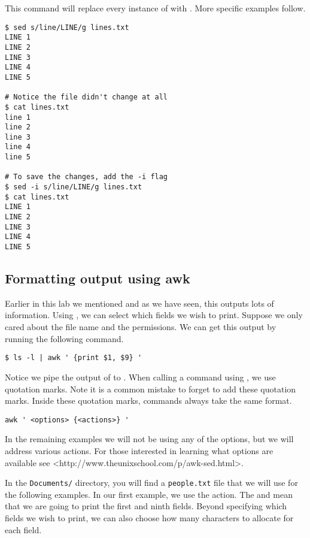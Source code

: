 This command will replace every instance of  with . More specific examples follow.

\begin{lstlisting}
$ sed s/line/LINE/g lines.txt
LINE 1
LINE 2
LINE 3
LINE 4
LINE 5

# Notice the file didn't change at all
$ cat lines.txt
line 1
line 2
line 3
line 4
line 5

# To save the changes, add the -i flag
$ sed -i s/line/LINE/g lines.txt
$ cat lines.txt
LINE 1
LINE 2
LINE 3
LINE 4
LINE 5
\end{lstlisting}

\subsection*{Formatting output using awk} %

Earlier in this lab we mentioned  and as we have seen, this outputs lots of information.
Using , we can select which fields we wish to print.
Suppose we only cared about the file name and the permissions.
We can get this output by running the following command.

\begin{lstlisting}
$ ls -l | awk ' {print $1, $9} '
\end{lstlisting}

Notice we pipe the output of  to .
When calling a command using , we use quotation marks.
Note it is a common mistake to forget to add these quotation marks.
Inside these quotation marks, commands always take the same format.

\begin{lstlisting}
awk ' <options> {<actions>} '
\end{lstlisting}

In the remaining examples we will not be using any of the options, but we will address various actions.
For those interested in learning what options are available see <http://www.theunixschool.com/p/awk-sed.html>.

In the \texttt{Documents/} directory, you will find a \texttt{people.txt} file that we will use for the following examples.
In our first example, we use the  action.
The  and  mean that we are going to print the first and ninth fields.
Beyond specifying which fields we wish to print, we can also choose how many characters to allocate for each field.

